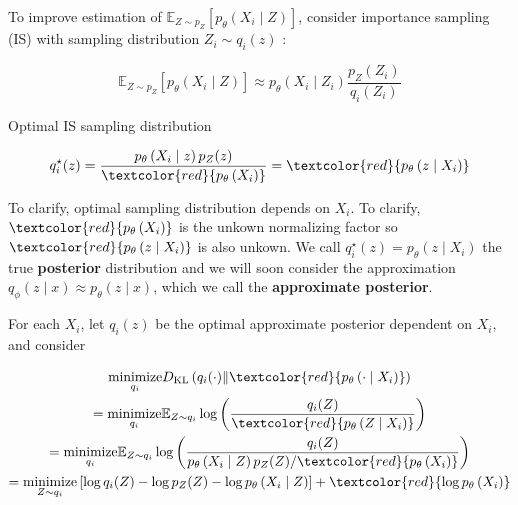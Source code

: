 \begin{concept}
    To improve estimation of $\mathbb{E}_{Z \sim p_{Z}}\left[p_{\theta}\left(X_{i} \mid Z\right)\right]$, consider importance sampling (IS) with sampling distribution $Z_{i} \sim q_{i}(z)$ :

    $$
    \mathbb{E}_{Z \sim p_{Z}}\left[p_{\theta}\left(X_{i} \mid Z\right)\right] \approx p_{\theta}\left(X_{i} \mid Z_{i}\right) \frac{p_{Z}\left(Z_{i}\right)}{q_{i}\left(Z_{i}\right)}
    $$

    Optimal IS sampling distribution

    $$
    q_{i}^{\star}(z)=\frac{p_{\theta}\left(X_{i} \mid z\right) p_{Z}(z)}{\textcolor{red}{p_{\theta}\left(X_{i}\right)}}=\textcolor{red}{p_{\theta}\left(z \mid X_{i}\right)}
    $$

    To clarify, optimal sampling distribution depends on $X_{i}$.
    To clarify, $\textcolor{red}{p_{\theta}\left(X_{i}\right)}$ is the unkown normalizing factor so $\textcolor{red}{p_{\theta}\left(z \mid X_{i}\right)}$ is also unkown.
    We call $q_{i}^{\star}(z)=p_{\theta}\left(z \mid X_{i}\right)$ the true \textbf{posterior} distribution and we will soon consider the approximation $q_{\phi}(z \mid x) \approx p_{\theta}(z \mid x)$, which we call the \textbf{approximate posterior}.

    \par\noindent\textcolor{gray}{\hdashrule{\textwidth}{0.4pt}{1pt 2pt}}

    For each $X_{i}$, let $q_i(z)$ be the optimal approximate posterior dependent on $X_i$, and consider

    $$
    \begin{gathered}
    \underset{q_{i}}{\operatorname{minimize}} D_{\mathrm{KL}}\left(q_{i}(\cdot) \| \textcolor{red}{p_{\theta}\left(\cdot \mid X_{i}\right)} \right)\\
    =\underset{q_{i}}{\operatorname{minimize}} \mathbb{E}_{Z \sim q_{i}} \log \left(\frac{q_{i}(Z)}{\textcolor{red}{p_{\theta}\left(Z \mid X_{i}\right)}}\right) \\
    =\underset{q_{i}}{\operatorname{minimize}} \mathbb{E}_{Z \sim q_{i}} \log \left(\frac{q_{i}(Z)}{p_{\theta}\left(X_{i} \mid Z\right) p_{Z}(Z) / \textcolor{red}{p_{\theta}\left(X_{i}\right)}}\right) \\
    =\underset{Z \sim q_{i}}{\operatorname{minimize}}\left[\log q_{i}(Z)-\log p_{Z}(Z)-\log p_{\theta}\left(X_{i} \mid Z\right)\right]+\textcolor{red}{\log p_{\theta}\left(X_{i}\right)}
    \end{gathered}
    $$


\end{concept}
